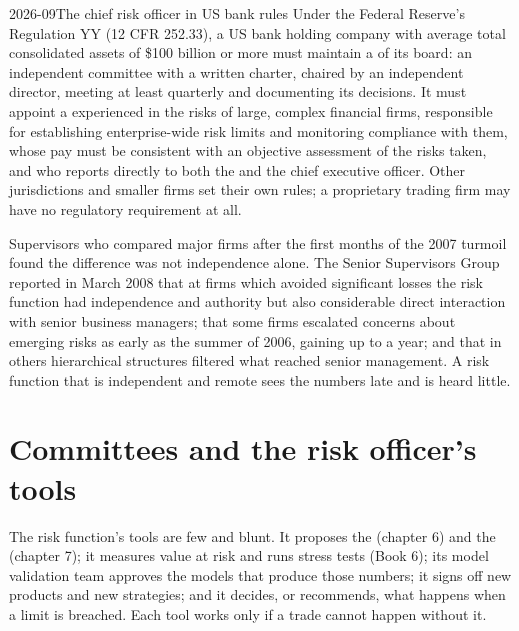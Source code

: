 \begin{dated}{2026-09}{The chief risk officer in US bank rules}\label{dat:fm:the-risk-management-function:rules}
Under the Federal Reserve's Regulation YY (12 CFR 252.33), a US bank holding company with average total consolidated assets of \$100 billion or more
must maintain a  of its board: an independent committee with a written charter, chaired by an independent director, meeting at least
quarterly and documenting its decisions. It must appoint a  experienced in the risks of large, complex financial firms, responsible
for establishing enterprise-wide risk limits and monitoring compliance with them, whose pay must be consistent with an objective assessment of the
risks taken, and who reports directly to both the  and the chief executive officer. Other jurisdictions and smaller firms set their
own rules; a proprietary trading firm may have no regulatory requirement at all.
\end{dated}

Supervisors who compared major firms after the first months of the 2007 turmoil found the difference was not independence alone. The Senior
Supervisors Group reported in March 2008 that at firms which avoided significant losses the risk function had independence and authority but also
considerable direct interaction with senior business managers; that some firms escalated concerns about emerging risks as early as the summer of
2006, gaining up to a year; and that in others hierarchical structures filtered what reached senior management. A risk function that is independent
and remote sees the numbers late and is heard little.

\section{Committees and the risk officer's tools}

The risk function's tools are few and blunt. It proposes the  (chapter 6) and the  (chapter 7); it measures value at
risk and runs stress tests (Book 6); its model validation team approves the models that produce those numbers; it signs off new products and new
strategies; and it decides, or recommends, what happens when a limit is breached. Each tool works only if a trade cannot happen without it.

